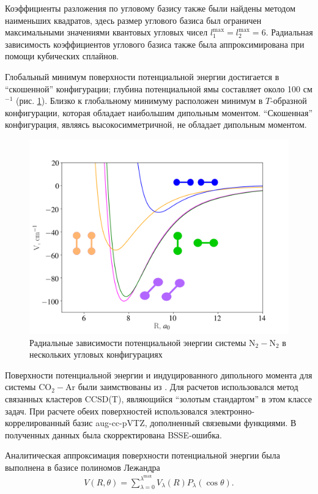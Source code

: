 Коэффициенты разложения по угловому базису также были найдены методом наименьших квадратов, здесь размер углового базиса был ограничен максимальными значениями квантовых угловых чисел $l_1^\text{max} = l_2^\text{max} = 6$. Радиальная зависимость коэффициентов углового базиса также была аппроксимирована при помощи кубических сплайнов. \par
Глобальный минимум поверхности потенциальной энергии достигается в \enquote{скошенной} конфигурации; глубина потенциальной ямы составляет около 100 см$^{-1}$ (рис. \ref{fig:n2n2-potential-curves}). Близко к глобальному минимуму расположен минимум в $T$-образной конфигурации, которая обладает наибольшим дипольным моментом. \enquote{Скошенная} конфигурация, являясь высокосимметричной, не обладает дипольным моментом. 

\setcounter{figure}{8}
\begin{figure}[H]
    \centering
    \includegraphics[width=0.75\linewidth]{./pictures/n2n2_potential.png}
    \caption{Радиальные зависимости потенциальной энергии системы N$_2-$N$_2$ в нескольких угловых конфигурациях}
    \label{fig:n2n2-potential-curves}
\end{figure}

Поверхности потенциальной энергии и индуцированного дипольного момента для системы CO$_2-$Ar были заимствованы из \cite{julia}. Для расчетов использовался метод связанных кластеров CCSD(T), являющийся \enquote{золотым стандартом} в этом классе задач. При расчете обеих поверхностей использовался электронно-коррелированный базис aug-cc-pVTZ, дополненный связевыми функциями. В полученных данных была скорректирована BSSE-ошибка. \par
Аналитическая аппроксимация поверхности потенциальной энергии была выполнена в базисе полиномов Лежандра
\begin{gather}
    V(R, \theta) = \sum_{\lambda = 0}^{\lambda^\text{max}} V_\lambda(R) P_\lambda(\cos \theta). \label{co2-ar-expansion}
\end{gather}

